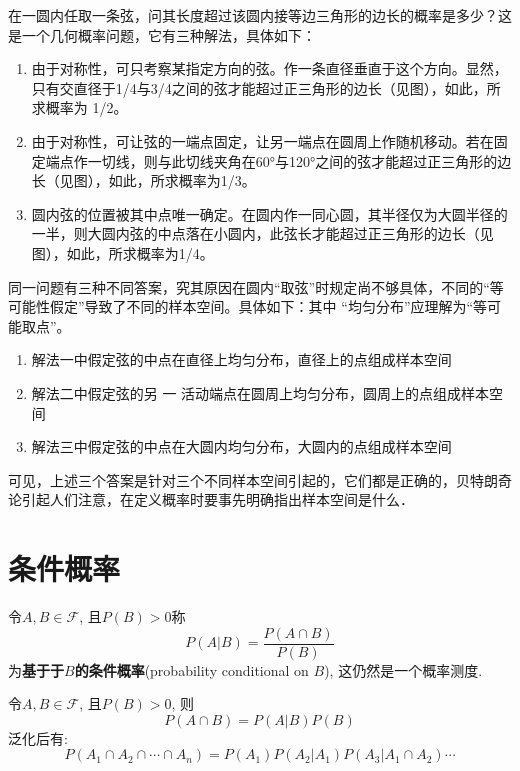 在一圆内任取一条弦，问其长度超过该圆内接等边三角形的边长的概率是多少？这是一个几何概率问题，它有三种解法，具体如下：
\begin{enumerate}
    \item 由于对称性，可只考察某指定方向的弦。作一条直径垂直于这个方向。显然，只有交直径于1/4与3/4之间的弦才能超过正三角形的边长（见图），如此，所求概率为 1/2。
    \item 由于对称性，可让弦的一端点固定，让另一端点在圆周上作随机移动。若在固定端点作一切线，则与此切线夹角在60°与120°之间的弦才能超过正三角形的边长（见图），如此，所求概率为1/3。
    \item 圆内弦的位置被其中点唯一确定。在圆内作一同心圆，其半径仅为大圆半径的一半，则大圆内弦的中点落在小圆内，此弦长才能超过正三角形的边长（见图），如此，所求概率为1/4。
\end{enumerate}

同一问题有三种不同答案，究其原因在圆内“取弦”时规定尚不够具体，不同的“等可能性假定”导致了不同的样本空间。具体如下：其中
“均匀分布”应理解为“等可能取点”。
\begin{enumerate}
    \item 解法一中假定弦的中点在直径上均匀分布，直径上的点组成样本空间
    \item 解法二中假定弦的另 一 活动端点在圆周上均匀分布，圆周上的点组成样本空间
    \item 解法三中假定弦的中点在大圆内均匀分布，大圆内的点组成样本空间
\end{enumerate}

可见，上述三个答案是针对三个不同样本空间引起的，它们都是正确的，贝特朗奇论引起人们注意，在定义概率时要事先明确指出样本空间是什么．

\section{条件概率}

\begin{definition}[条件概率]
    令$A,B \in \mathscr{F}$, 且$P(B)>0$称
    \[ P(A|B) = \frac{P(A \cap B)}{P(B)}\]
    为\textbf{基于于$B$的条件概率}(probability conditional on $B$), 这仍然是一个概率测度.
\end{definition}

\begin{theorem}[乘法法则]
    令$A,B \in \mathscr{F}$, 且$P(B)>0$, 则
    \[ P(A \cap B) = P(A|B)P(B) \]
    泛化后有:
    \[ P(A_1 \cap A_2 \cap \cdots \cap A_n) = P(A_{1})P(A_2|A_1)P(A_3|A_1\cap A_2) \cdots  \]
\end{theorem}

